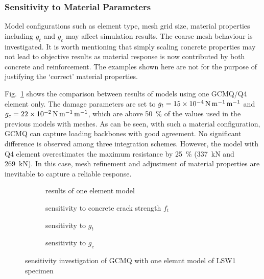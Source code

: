 \documentclass[3p,review,sort&compress,11pt,fleqn]{elsarticle}
\newcommand*{\figref}[1]{Fig.~\ref{#1}}
\begin{document}
\subsubsection{Sensitivity to Material Parameters}
Model configurations such as element type, mesh grid size, material properties including $g_t$ and $g_c$ may affect simulation results. The coarse mesh behaviour is investigated. It is worth mentioning that simply scaling concrete properties may not lead to objective results as material response is now contributed by both concrete and reinforcement. The examples shown here are not for the purpose of justifying the `correct' material properties.

\figref{fig:salonikios_single} shows the comparison between results of models using one GCMQ/Q4 element only. The damage parameters are set to $g_t=\SI{15E-4}{\newton\per\metre\per\metre}$ and $g_c=\SI{22E-2}{\newton\per\metre\per\metre}$, which are above \SI{50}{\percent} of the values used in the previous models with  meshes. As can be seen, with such a material configuration, GCMQ can capture loading backbones with good agreement. No significant difference is observed among three integration schemes. However, the model with Q4 element overestimates the maximum resistance by \SI{25}{\percent} (\SI{337}{\kilo\newton} and \SI{269}{\kilo\newton}). In this case, mesh refinement and adjustment of material properties are inevitable to capture a reliable response.
\begin{figure}[htb]
\scriptsize\centering
\begin{subfigure}[b]{.48\textwidth}

\caption{results of one element model}\label{fig:salonikios_single}
\end{subfigure}\quad
\begin{subfigure}[b]{.48\textwidth}

\caption{sensitivity to concrete crack strength $f_t$}\label{fig:salonikios_ft}
\end{subfigure}
\begin{subfigure}[b]{.48\textwidth}

\caption{sensitivity to $g_t$}\label{fig:salonikios_gt}
\end{subfigure}\quad
\begin{subfigure}[b]{.48\textwidth}

\caption{sensitivity to $g_c$}\label{fig:salonikios_gc}
\end{subfigure}
\caption{sensitivity investigation of GCMQ with one elemnt model of LSW1 specimen}\label{fig:salonikios_sensitivity}
\end{figure}
\end{document}
